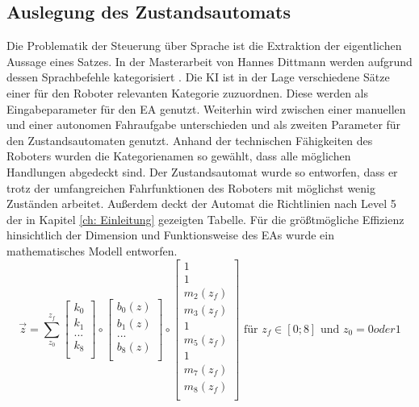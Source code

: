 	\subsection{Auslegung des Zustandsautomats}
	Die Problematik der Steuerung über Sprache ist die Extraktion der eigentlichen Aussage eines Satzes. In der Masterarbeit von Hannes Dittmann werden aufgrund dessen Sprachbefehle kategorisiert \cite{Dittmann}. Die KI ist in der Lage verschiedene Sätze einer für den Roboter relevanten Kategorie zuzuordnen. Diese werden als Eingabeparameter für den EA genutzt. Weiterhin wird zwischen einer manuellen und einer autonomen Fahraufgabe unterschieden und als zweiten Parameter für den Zustandsautomaten genutzt. Anhand der technischen Fähigkeiten des Roboters wurden die Kategorienamen so gewählt, dass alle möglichen Handlungen abgedeckt sind. Der Zustandsautomat wurde so entworfen, dass er trotz der umfangreichen Fahrfunktionen des Roboters mit möglichst wenig Zuständen arbeitet. Außerdem deckt der Automat die Richtlinien nach Level 5 der in Kapitel \ref{ch: Einleitung} gezeigten Tabelle. Für die größtmögliche Effizienz hinsichtlich der Dimension und Funktionsweise des EAs wurde ein mathematisches Modell entworfen.\\
	
	\begin{equation}
	\vec{z}=\sum_{z_0}^{z_f} \left[ \begin{array}{r}
	k_0  \\
	k_{1}  \\
	...  \\
	k_8  \\
	\end{array}\right] \circ
	\left[ \begin{array}{r}
	b_0(z)  \\
	b_{1}(z)  \\
	...  \\
	b_8(z)  \\
	\end{array}\right]  \circ
	\left[ \begin{array}{r}
	1  \\
	1  \\
	m_{2}(z_f)  \\
	m_{3}(z_f)   \\
	1  \\
	m_{5}(z_f)  \\
	1   \\
	m_{7}(z_f)   \\
	m_8(z_f)  \\
	\end{array}\right]
	\text{ für }z_f\in[0;8] \text{ und }z_0=0 oder 1
	\label{eq: statemachine}
	\end{equation}\\
	
